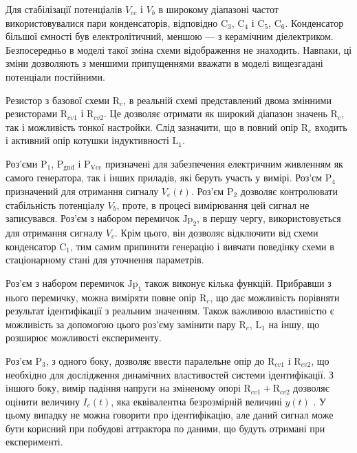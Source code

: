 Для стабілізації потенціалів
$V_{cc} $ і
$V_b $ в широкому діапазоні частот використовувалися пари
конденсаторів, відповідно
$\mathrm{C}_3$,
$\mathrm{C}_4$ і
$\mathrm{C}_5$,
$\mathrm{C}_6$. Конденсатор більшої ємності був електролітичний,
меншою --- з керамічним діелектриком. Безпосередньо в моделі
такої зміна схеми відображення не знаходить. Навпаки, ці зміни
дозволяють з меншими припущеннями вважати в моделі вищезгадані
потенціали постійними.

Резистор з базової схеми
$\mathrm{R}_c $, в реальній схемі представлений двома змінними резисторами
$\mathrm{R}_{cv1} $ і $ \mathrm{R}_{cv2} $.
Це дозволяє отримати як широкий діапазон значень
$\mathrm{R}_c $, так і можливість тонкої настройки. Слід зазначити,
що в повний опір
$\mathrm{R}_c $ входить і активний опір котушки індуктивності
$\mathrm{L}_{1} $.


Роз'єми
$\mathrm{P}_1 $,
$\mathrm{P}_\mathrm{gnd} $ і
$\mathrm{P}_\mathrm{Vcc} $ призначені для забезпечення електричним
живленням як самого генератора, так і інших приладів, які беруть
участь у вимірі. Роз'єм
$\mathrm{P}_4 $ призначений для отримання сигналу
$V_e (t) $. Роз'єм
$\mathrm{P}_2 $ дозволяє контролювати стабільність потенціалу
$V_b $, проте, в процесі вимірювання цей сигнал не записувався. Роз'єм
з набором перемичок
$\mathrm{Jp}_2 $, в першу чергу, використовується для отримання сигналу
$V_c $. Крім цього, він дозволяє відключити від схеми конденсатор
$\mathrm{C}_1 $, тим самим припинити генерацію і вивчати поведінку
схеми в стаціонарному стані для уточнення параметрів.

Роз'єм з набором перемичок
$\mathrm{Jp}_1 $ також виконує кілька функцій. Прибравши з нього
перемичку, можна виміряти повне опір
$\mathrm{R}_{c} $, що дає можливість порівняти результат ідентифікації
з реальним значенням. Також важливою властивістю є можливість
за допомогою цього роз'єму замінити пару
$\mathrm{R}_{c} $,
$\mathrm{L}_{1} $ на іншу, що розширює можливості експерименту.


Роз'єм
$\mathrm{P}_{3} $, з одного боку, дозволяє ввести паралельне опір до
$\mathrm{R}_{cv1} $ і
$\mathrm{R}_{cv2} $, що необхідно для дослідження динамічних
властивостей системи ідентифікації. З іншого боку, вимір падіння
напруги на зміненому опорі
$\mathrm{R}_{cv1} + \mathrm{R}_{cv2} $ дозволяє оцінити величину
$I_c(t) $, яка еквівалентна безрозмірній величині
$y(t)$ . У цьому випадку не можна говорити про ідентифікацію,
але даний сигнал може бути корисний при побудові аттрактора
по даними, що будуть отримані при експерименті.



